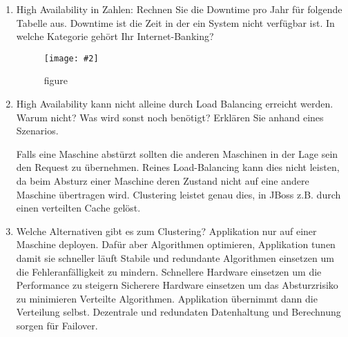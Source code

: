\documentclass[a4paper,10pt]{scrreprt}
\newcommand{\pic}[2][figure]{\begin{figure}[h]
 \centering
 \texttt{[image: \#2]}
 \caption{#1}
\end{figure}
}
\begin{document}
\begin{enumerate}
\item High Availability in Zahlen: Rechnen Sie die Downtime pro Jahr für folgende Tabelle aus. Downtime
ist die Zeit in der ein System nicht verfügbar ist. In welche Kategorie gehört Ihr Internet-Banking?
\pic{99.png}
\item High Availability kann nicht alleine durch Load Balancing erreicht werden.
Warum nicht? Was wird sonst noch benötigt? Erklären Sie anhand eines Szenarios.

Falls eine Maschine abstürzt sollten die anderen Maschinen in der Lage sein den
Request zu übernehmen. Reines Load-Balancing kann dies nicht leisten, da beim
Absturz einer Maschine deren Zustand nicht auf eine andere Maschine übertragen
wird. Clustering leistet genau dies, in JBoss z.B. durch einen verteilten Cache
gelöst.

\item Welche Alternativen gibt es zum Clustering?
\subitem Applikation nur auf einer Maschine deployen. Dafür aber
\subsubitem Algorithmen optimieren, Applikation tunen damit sie schneller läuft
\subsubitem Stabile und redundante Algorithmen einsetzen um die Fehleranfälligkeit zu mindern.
\subsubitem Schnellere Hardware einsetzen um die Performance zu steigern
\subsubitem Sicherere Hardware einsetzen um das Absturzrisiko zu minimieren
\subitem Verteilte Algorithmen. Applikation übernimmt dann die Verteilung selbst. Dezentrale und
redundaten Datenhaltung und Berechnung sorgen für Failover.


\end{enumerate}
\end{document}
